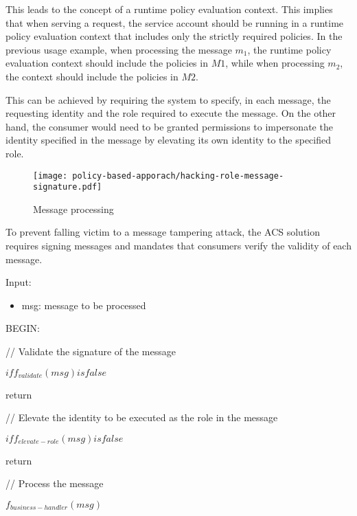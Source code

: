 \vspace{15pt}

This leads to the concept of a runtime policy evaluation context. This implies that when serving a request, the service account should be running in a runtime policy evaluation context that includes only the strictly required policies. 
In the previous usage example, when processing the message $m_1$, the runtime policy evaluation context should include the policies in $M1$, while when processing $m_2$, the context should include the policies in $M2$.

This can be achieved by requiring the system to specify, in each message, the requesting identity and the role required to execute the message. On the other hand, the consumer would need to be granted permissions to impersonate the identity specified in the message by elevating its own identity to the specified role.

\begin{figure}[h]
    \centering
    \texttt{[image: policy-based-apporach/hacking-role-message-signature.pdf]}
    \caption{Message processing}
    \label{fig:hacking-role-message-signature}
\end{figure}

To prevent falling victim to a message tampering attack, the ACS solution requires signing messages and mandates that consumers verify the validity of each message.

\begin{boxF}
    \begin{definition}
        Input:
        \begin{itemize}
            \item msg: message to be processed
        \end{itemize}

        BEGIN:

            \hspace{2pt} // Validate the signature of the message

            \hspace{2pt} $if f_{validate}(msg) is false$
            
            \hspace{10pt} return

            \hspace{2pt} // Elevate the identity to be executed as the role in the message

            \hspace{2pt} $if f_{elevate-role}(msg) is false$
            
            \hspace{10pt} return

            \hspace{2pt} // Process the message
            
            \hspace{2pt} $f_{business-handler}(msg)$

        \label{definition:message-processing}
    \end{definition}
\end{boxF}

